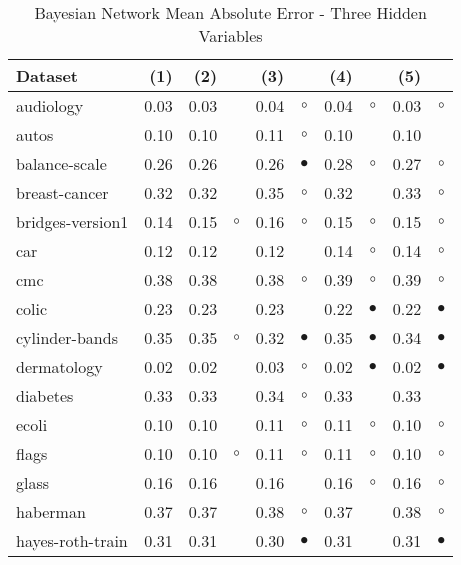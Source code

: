 \newpage
{\centering \footnotesize \begin{longtable}{lrr@{\hspace{0.1cm}}cr@{\hspace{0.1cm}}cr@{\hspace{0.1cm}}cr@{\hspace{0.1cm}}c}
\caption{\label{bnmae3}Bayesian Network Mean Absolute Error - Three Hidden Variables}
\\
\hline
Dataset & (1)& (2) & & (3) & & (4) & & (5) & \\
\hline
audiology & 0.03 & 0.03 &           & 0.04 &   $\circ$ & 0.04 &   $\circ$ & 0.03 &    $\circ$\\
autos & 0.10 & 0.10 &           & 0.11 &   $\circ$ & 0.10 &           & 0.10 &           \\
balance-scale & 0.26 & 0.26 &           & 0.26 & $\bullet$ & 0.28 &   $\circ$ & 0.27 &    $\circ$\\
breast-cancer & 0.32 & 0.32 &           & 0.35 &   $\circ$ & 0.32 &           & 0.33 &    $\circ$\\
bridges-version1 & 0.14 & 0.15 &   $\circ$ & 0.16 &   $\circ$ & 0.15 &   $\circ$ & 0.15 &    $\circ$\\
car & 0.12 & 0.12 &           & 0.12 &           & 0.14 &   $\circ$ & 0.14 &    $\circ$\\
cmc & 0.38 & 0.38 &           & 0.38 &   $\circ$ & 0.39 &   $\circ$ & 0.39 &    $\circ$\\
colic & 0.23 & 0.23 &           & 0.23 &           & 0.22 & $\bullet$ & 0.22 &  $\bullet$\\
cylinder-bands & 0.35 & 0.35 &   $\circ$ & 0.32 & $\bullet$ & 0.35 & $\bullet$ & 0.34 &  $\bullet$\\
dermatology & 0.02 & 0.02 &           & 0.03 &   $\circ$ & 0.02 & $\bullet$ & 0.02 &  $\bullet$\\
diabetes & 0.33 & 0.33 &           & 0.34 &   $\circ$ & 0.33 &           & 0.33 &           \\
ecoli & 0.10 & 0.10 &           & 0.11 &   $\circ$ & 0.11 &   $\circ$ & 0.10 &    $\circ$\\
flags & 0.10 & 0.10 &   $\circ$ & 0.11 &   $\circ$ & 0.11 &   $\circ$ & 0.10 &    $\circ$\\
glass & 0.16 & 0.16 &           & 0.16 &           & 0.16 &   $\circ$ & 0.16 &    $\circ$\\
haberman & 0.37 & 0.37 &           & 0.38 &   $\circ$ & 0.37 &           & 0.38 &    $\circ$\\
hayes-roth-train & 0.31 & 0.31 &           & 0.30 & $\bullet$ & 0.31 &           & 0.31 &  $\bullet$\\

\end{longtable}}
